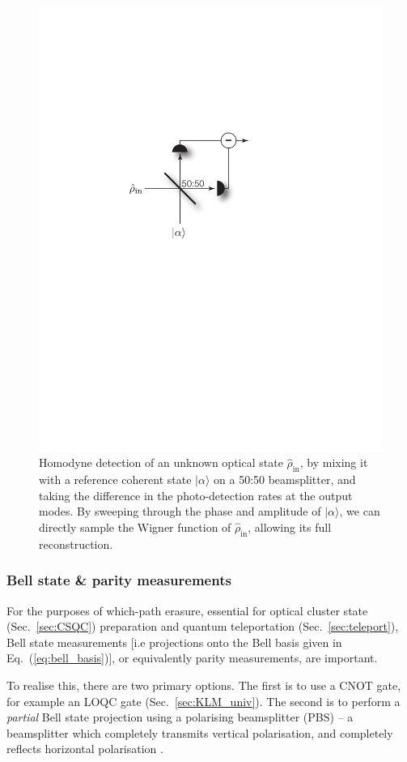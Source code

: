 \documentclass[aps, rmp, twocolumn, amsmath, amssymb, nofootinbib, superscriptaddress, longbibliography, floatfix, table-of-contents, eqsecnum]{revtex4-1}
\newcommand{\ket}[1]{|#1\rangle}
\begin{document}
\begin{figure}[!htb]
\includegraphics[width=0.6\columnwidth]{homodyne}
\caption{Homodyne detection of an unknown optical state $\hat\rho_\text{in}$, by mixing it with a reference coherent state $\ket\alpha$ on a 50:50 beamsplitter, and taking the difference in the photo-detection rates at the output modes. By sweeping through the phase and amplitude of $\ket\alpha$, we can directly sample the Wigner function of $\hat\rho_\text{in}$, allowing its full reconstruction.} \label{fig:homodyne}
\end{figure}

%
%

\subsubsection{Bell state \& parity measurements} \label{sec:bell_proj} 

For the purposes of which-path erasure, essential for optical cluster state (Sec.~\ref{sec:CSQC}) preparation and quantum teleportation (Sec.~\ref{sec:teleport}), Bell state measurements [i.e projections onto the Bell basis given in Eq.~(\ref{eq:bell_basis})], or equivalently parity measurements, are important.

To realise this, there are two primary options. The first is to use a CNOT gate, for example an LOQC gate (Sec.~\ref{sec:KLM_univ}). The second is to perform a \textit{partial} Bell state projection using a polarising beamsplitter (PBS) -- a beamsplitter which completely transmits vertical polarisation, and completely reflects horizontal polarisation \cite{bib:BraunsteinMann95}.
\end{document}
